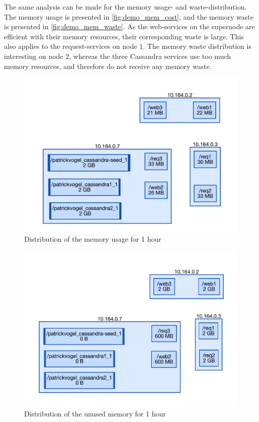 \noindent
The same analysis can be made for the memory usage- and waste-distribution. The memory usage is presented in \autoref{fig:demo_mem_cost}, and the memory waste is presented in \autoref{fig:demo_mem_waste}. As the web-services on the supernode are efficient with their memory resources, their corresponding waste is large. This also applies to the request-services on node $1$. The memory waste distribution is interesting on node $2$, whereas the three Cassandra services use too much memory resources, and therefore do not receive any memory waste.\\

\begin{figure}
    \centering
    \includegraphics[width=\textwidth]{gfx/demo_mem_cost}
    \caption{Distribution of the memory usage for 1 hour}
    \label{fig:demo_mem_cost}
\end{figure}

\begin{figure}
    \centering
    \includegraphics[width=\textwidth]{gfx/demo_mem_waste}
    \caption{Distribution of the unused memory for 1 hour}
    \label{fig:demo_mem_waste}
\end{figure}

